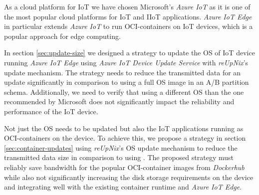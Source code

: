 As a cloud platform for \ac{IoT} we have chosen Microsoft's \textit{Azure IoT}
as it is one of the most popular cloud platforms for \ac{IoT} and \ac{IIoT} applications.
\textit{Azure IoT Edge} in particular extends \textit{Azure IoT} to run
\ac{OCI}-containers on \ac{IoT} devices, which is a popular approach for edge
computing.

In section \ref{sec:update-size} we designed a strategy to update the \ac{OS} of \ac{IoT} device running
\textit{Azure IoT Edge} using \textit{Azure IoT Device Update Service} with
\textit{reUpNix}'s update mechanism. The strategy needs to reduce the transmitted data
for an update significantly in comparison to using a full \ac{OS} image in an
A/B partition schema. Additionally, we need to verify that using a different
\ac{OS} than the one recommended by Microsoft does not significantly impact
the reliability and performance of the \ac{IoT} device.


Not just the \ac{OS} needs to be updated but also the \ac{IoT} applications
running as \ac{OCI}-containers on the device. To achieve this,
we propose a strategy in section \ref{sec:container-updates}
using \textit{reUpNix}'s \ac{OS} update mechanism to reduce the transmitted data
size in comparison to using . The proposed strategy must
reliably save bandwidth for the popular \ac{OCI}-container images from
\textit{Dockerhub} while also not significantly increasing the disk storage
requirements on the device and integrating well with the existing container
runtime and \textit{Azure IoT Edge}.

